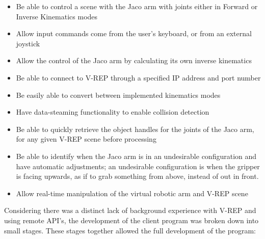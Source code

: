 \documentclass[12pt,openany,a4paper]{book}
\begin{document}
\begin{itemize}
	\item Be able to control a scene with the Jaco arm with joints either in Forward or Inverse Kinematics modes
	\item Allow input commands come from the user's keyboard, or from an external joystick
	\item Allow the control of the Jaco arm by calculating its own inverse kinematics
	\item Be able to connect to V-REP through a specified IP address and port number
	\item Be easily able to convert between implemented kinematics modes
	\item Have data-steaming functionality to enable collision detection
	\item Be able to quickly retrieve the object handles for the joints of the Jaco arm, for any given V-REP scene before processing
	\item Be able to identify when the Jaco arm is in an undesirable configuration and have automatic adjustments; an undesirable configuration is when the gripper is facing upwards, as if to grab something from above, instead of out in front.
	\item Allow real-time manipulation of the virtual robotic arm and V-REP scene
\end{itemize}


Considering there was a distinct lack of background experience with V-REP and using remote API's, the development of the client program was broken down into small stages. These stages together allowed the full development of the program:
\end{document}
